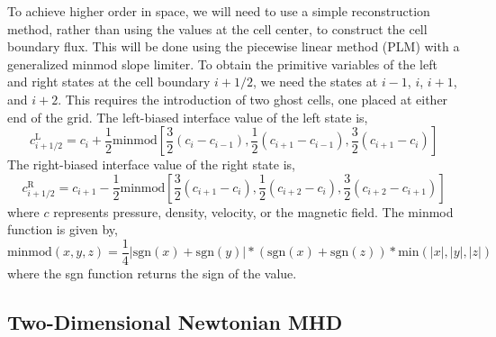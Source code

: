 \documentclass{article}
\begin{document}
To achieve higher order in space, we will need to use a simple reconstruction method, rather than using the values at the cell center, to construct the cell boundary flux. This will be done using the piecewise linear method (PLM) with a generalized minmod slope limiter. To obtain the primitive variables of the left and right states at the cell boundary $i+1/2$, we need the states at $i-1$, $i$, $i+1$, and $i+2$. This requires the introduction of two ghost cells, one placed at either end of the grid. The left-biased interface value of the left state is,
\begin{equation}
    c^{\text{L}}_{i+1/2} = c_i + \frac{1}{2}\text{minmod}[\frac{3}{2}(c_i-c_{i-1}), \frac{1}{2}(c_{i+1}-c_{i-1}),\frac{3}{2}(c_{i+1}-c_i)]
\end{equation}
The right-biased interface value of the right state is,
\begin{equation}
    c^{\text{R}}_{i+1/2} = c_{i+1} - \frac{1}{2}\text{minmod}[\frac{3}{2}(c_{i+1}-c_i), \frac{1}{2}(c_{i+2}-c_i),\frac{3}{2}(c_{i+2}-c_{i+1})]
\end{equation}
where $c$ represents pressure, density, velocity, or the magnetic field. The minmod function is given by,
\begin{equation}
    \text{minmod}(x,y,z) = \frac{1}{4}|\text{sgn}(x)+\text{sgn}(y)|*(\text{sgn}(x)+\text{sgn}(z))*\text{min}(|x|,|y|,|z|)
\end{equation}
where the sgn function returns the sign of the value.

\vspace{6mm}
\begin{center}
    \subsection{Two-Dimensional Newtonian MHD}\label{S5}
\end{center}
\end{document}
